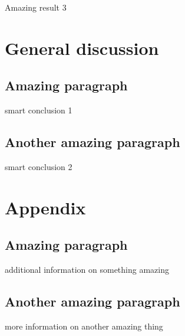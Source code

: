 \documentclass[
  man,floatsintext]{apa6}
\begin{document}
Amazing result 3

\hypertarget{general-discussion}{%
\section{General discussion}\label{general-discussion}}

\hypertarget{amazing-paragraph}{%
\subsection{Amazing paragraph}\label{amazing-paragraph}}

smart conclusion 1

\hypertarget{another-amazing-paragraph}{%
\subsection{Another amazing paragraph}\label{another-amazing-paragraph}}

smart conclusion 2

\hypertarget{appendix}{%
\section{Appendix}\label{appendix}}

\hypertarget{appendix-appendix}{%
\appendix}


\hypertarget{amazing-paragraph-1}{%
\subsection{Amazing paragraph}\label{amazing-paragraph-1}}

additional information on something amazing

\hypertarget{another-amazing-paragraph-1}{%
\subsection{Another amazing paragraph}\label{another-amazing-paragraph-1}}

more information on another amazing thing
\end{document}
